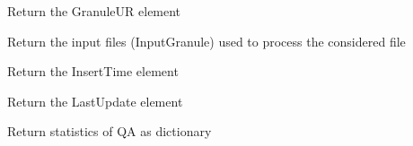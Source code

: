 \documentclass[a4paper,11pt,oneside]{sphinxmanual}
\begin{document}
\begin{fulllineitems}
\begin{fulllineitems}
\end{fulllineitems}


\begin{fulllineitems}
\label{pymodis/pymodis:pymodis.parsemodis.parseModis.retGranuleUR}
Return the GranuleUR element

\end{fulllineitems}


\begin{fulllineitems}
\label{pymodis/pymodis:pymodis.parsemodis.parseModis.retInputGranule}
Return the input files (InputGranule) used to process the considered
file

\end{fulllineitems}


\begin{fulllineitems}
\label{pymodis/pymodis:pymodis.parsemodis.parseModis.retInsertTime}
Return the InsertTime element

\end{fulllineitems}


\begin{fulllineitems}
\label{pymodis/pymodis:pymodis.parsemodis.parseModis.retLastUpdate}
Return the LastUpdate element

\end{fulllineitems}


\begin{fulllineitems}
\label{pymodis/pymodis:pymodis.parsemodis.parseModis.retMeasure}
Return statistics of QA as dictionary

\end{fulllineitems}



\end{fulllineitems}
\end{document}
